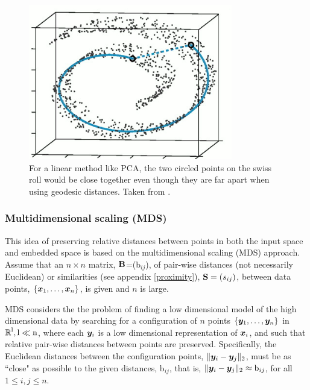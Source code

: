 \begin{figure}[h]
\centering
\includegraphics[width=3.5in]{./images/ISOMAP.png}
\caption{For a linear method like PCA, the two circled points on the swiss roll would be close together even though they are far apart when using geodesic distances. Taken from \cite{TenenbaumJB2000Aggf}.}
      \label{fig:Swiss roll}
\end{figure}


\subsubsection{Multidimensional scaling (MDS)}
This idea of preserving relative distances between points in both the input space and embedded space is based on the multidimensional scaling (MDS) approach. Assume that an $n\times n$ matrix, $\textbf{B}$=(b$_{ij}$), of pair-wise distances (not necessarily Euclidean) or similarities (see appendix \ref{proximity}), $\textbf{S} = (s_{ij})$, between data points, $\{\boldsymbol{x}_{1}, \ldots, \boldsymbol{x}_{n} \}$, is given and $n$ is large.


MDS \cite{CoxT2000, MardiaK.V1979Ma} considers the the problem of finding a low dimensional model of the high dimensional data by searching for a configuration of $n$ points $\{\boldsymbol{y}_{1}, \ldots, \boldsymbol{y}_{n} \}$ in $\operatorname{\mathbb{R}}^{\text{l}}, \text{l} \ll \text{n}$, where each $\boldsymbol{y}_{i}$ is a low dimensional representation of $\boldsymbol{x}_{i}$, and such that relative pair-wise distances between points are preserved. Specifically, the Euclidean distances between the configuration points, $\lVert\boldsymbol{y}_{i} - \boldsymbol{y}_{j}\rVert_{2}$, must be as ``close" as possible to  the given distances, b$_{ij}$, that is, $\lVert\boldsymbol{y}_{i} - \boldsymbol{y}_{j}\rVert_{2} \approx \text{b}_{ij}$, for all $1 \leq i, j \leq n$.

